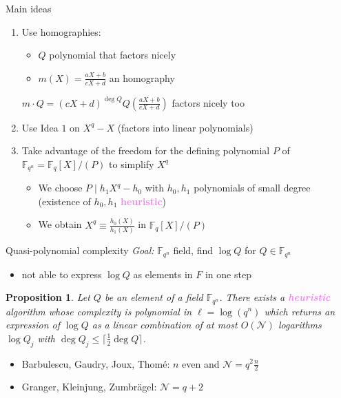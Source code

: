 \documentclass[xcolor=x11names,compress]{beamer}
\theoremstyle{break}
\newtheorem{prop}[thm]{Proposition}
\theoremstyle{sc}
\theoremstyle{definition}
\theoremstyle{remark}
\begin{document}
\begin{frame}{Main ideas}
  \begin{enumerate}
    \item Use homographies:
      \begin{itemize}
        \item $Q$ polynomial that factors nicely
        \item $m(X) = \frac{aX+b}{cX+d}$ an homography
      \end{itemize}
      $m\cdot Q = (cX+d)^{\deg Q}Q(\frac{aX+b}{cX+d})$ factors nicely too
      \newline
    \item Use Idea $1$ on $X^q-X$ (factors into linear polynomials)
      \newline
    \item Take advantage of the freedom for the defining polynomial $P$ of
      $\mathbb{F}_{q^n}=\mathbb{F}_q[X]/(P)$ to simplify $X^q$
      \begin{itemize}
        \item We choose $P\;|\;h_1X^q-h_0$ with $h_0, h_1$ polynomials of small
          degree (existence of $h_0, h_1$
          \textcolor{violet}{\textbf{heuristic}})
        \item We obtain $X^q \equiv \frac{h_0(X)}{h_1(X)}$ in
          $\mathbb{F}_q[X]/(P)$
      \end{itemize}
  \end{enumerate}
\end{frame}

\begin{frame}{Quasi-polynomial complexity}
  \emph{Goal:} $\mathbb{F}_{q^n}$ field, find $\log Q$ for $Q\in
  \mathbb{F}_{q^n}$ 
  \begin{itemize}
    \item not able to express $\log Q$ as elements in $F$ in one step 
  \end{itemize}
\begin{prop}
  Let $Q$ be an element of a field $\mathbb{F}_{q^n}$. There exists a
  \textcolor{violet}{\textbf{heuristic}} algorithm whose complexity is polynomial in
  $\ell=\log(q^n)$ which returns an expression of $\log Q$ as a linear combination of
  at most $O(\mathcal N)$ logarithms $\log Q_j$ with $\deg Q_j\leq \lceil
  \frac{1}{2}\deg Q\rceil$.
\end{prop}
\begin{itemize}
  \item Barbulescu, Gaudry, Joux, Thomé: $n$ even and $\mathcal
    N=q^2 \frac{n}{2}$
  \item Granger, Kleinjung, Zumbrägel: $\mathcal N =
    q+2$
\end{itemize}
\end{frame}
\end{document}
